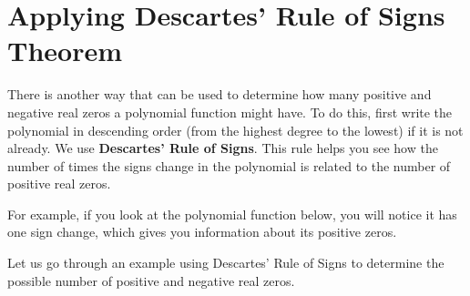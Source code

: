 \section{Applying Descartes' Rule of Signs Theorem}

There is another way that can be used to determine how many positive and negative
real zeros a polynomial function might have. To do this, first write the polynomial
in descending order (from the highest degree to the lowest) if it is not already. We
use \textbf{Descartes' Rule of Signs}. This rule helps you see how the number of times
the signs change in the polynomial is related to the number of positive real zeros.

For example, if you look at the polynomial function below, you will notice it has
one sign change, which gives you information about its positive zeros.

Let us go through an example using Descartes' Rule of Signs to determine the
possible number of positive and negative real zeros.


